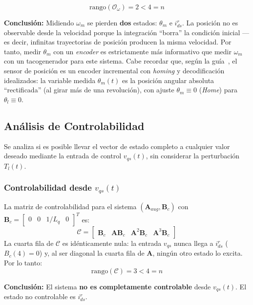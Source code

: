 \documentclass[12pt, a4paper,journal, onecolumn, compsoc]{IEEEtran}
\begin{document}
\begin{equation}
    \text{rango}(\mathcal{O}_\omega) = 2 < 4 = n
\end{equation}

\textbf{Conclusión:} Midiendo $\omega_m$ se pierden \textbf{dos} estados: $\theta_m$ e $i_{ds}^r$. La posición no es observable desde la velocidad porque la integración ``borra'' la condición inicial ---es decir, infinitas trayectorias de posición producen la misma velocidad. Por tanto, medir $\theta_m$ con un \textit{encoder} es estrictamente más informativo que medir $\omega_m$ con un tacogenerador para este sistema. Cabe recordar que, según la guía~\cite{guia_trabajo}, el sensor de posición es un encoder incremental con \textit{homing} y decodificación idealizados: la variable medida $\theta_m(t)$ es la posición angular absoluta ``rectificada'' (al girar más de una revolución), con ajuste $\theta_m \equiv 0$ (\textit{Home}) para $\theta_l \equiv 0$.

\subsection{Análisis de Controlabilidad}
Se analiza si es posible llevar el vector de estado completo a cualquier valor deseado mediante la entrada de control $v_{qs}(t)$, sin considerar la perturbación $T_l(t)$.

\subsubsection{Controlabilidad desde \texorpdfstring{$v_{qs}(t)$}{v_qs(t)}}
La matriz de controlabilidad para el sistema $(\bm{A}_{aug}, \bm{B}_c)$ con $\bm{B}_c = \begin{bmatrix} 0 & 0 & 1/L_q & 0 \end{bmatrix}^T$ es:
\begin{equation}
    \mathcal{C} = \begin{bmatrix} \bm{B}_c & \bm{A}\bm{B}_c & \bm{A}^2\bm{B}_c & \bm{A}^3\bm{B}_c \end{bmatrix}
\end{equation}
La cuarta fila de $\mathcal{C}$ es idénticamente nula: la entrada $v_{qs}$ nunca llega a $i_{ds}^r$ ($B_c(4)=0$) y, al ser diagonal la cuarta fila de $\bm{A}$, ningún otro estado lo excita. Por lo tanto:
\begin{equation}
    \text{rango}(\mathcal{C}) = 3 < 4 = n
\end{equation}

\textbf{Conclusión:} El sistema \textbf{no es completamente controlable} desde $v_{qs}(t)$. El estado no controlable es $i_{ds}^r$.
\end{document}
